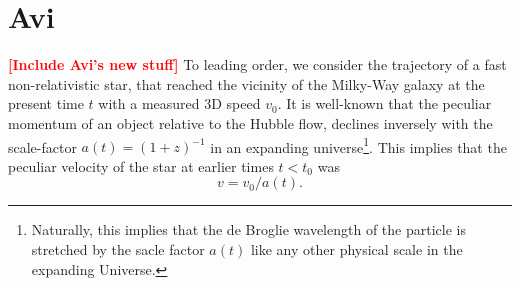 \documentclass[a4paper,twocolumn]{emulateapj}
\newcommand{\colr}[1]{{\bf \textcolor{red}{[#1]}}}
\begin{document}
\section{Avi}
\colr{Include Avi's new stuff}
To leading order, we consider the trajectory of a fast
non-relativistic star, that reached the vicinity of the Milky-Way
galaxy at the present time $t$ with a measured 3D speed $v_0$. It is
well-known that the peculiar momentum of an object relative to the
Hubble flow, declines inversely with the scale-factor
$a(t)=(1+z)^{-1}$ in an expanding universe\footnote{Naturally, this
implies that the de Broglie wavelength of the particle is stretched by
the sacle factor $a(t)$ like any other physical scale in the expanding
Universe.}. This implies that the peculiar velocity of the star at
earlier times $t<t_0$ was 
\begin{equation}
v=v_0/a(t).
\label{eq:1}
\end{equation}
\end{document}
